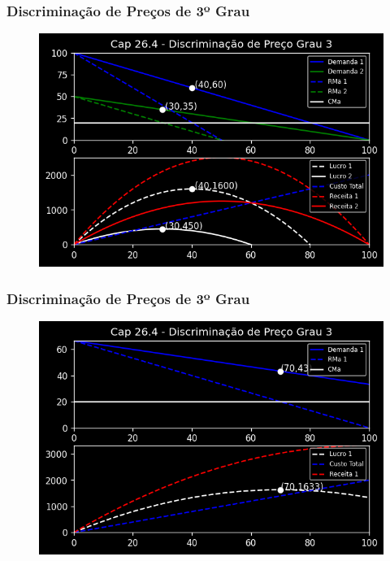 \documentclass{beamer}[10]
\begin{document}
\begin{frame}
	\frametitle{Discriminação de Preços de 3º Grau}

	\begin{figure}[H]
		\centering
		\includegraphics[scale=0.7]{cap26_4-discriminacao_grau3.png}
	\end{figure}

\end{frame}

\begin{frame}
	\frametitle{Discriminação de Preços de 3º Grau}

	\begin{figure}[H]
		\centering
		\includegraphics[scale=0.7]{cap26_4-discriminacao_grau3_2.png}
	\end{figure}

\end{frame}
\end{document}
